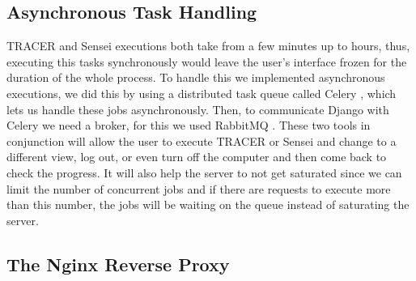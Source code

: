 \subsection{Asynchronous Task Handling}

\ac{TRACER} and Sensei executions both take from a few minutes up to hours,
thus, executing this tasks synchronously would leave the user's interface frozen
for the duration of the whole process.
To handle this we implemented asynchronous executions,
we did this by using a distributed task queue called Celery \autocite{Celery},
which lets us handle these jobs asynchronously.
Then, to communicate Django with Celery we need a broker,
for this we used RabbitMQ \autocite{RabbitMQ}.
These two tools in conjunction will allow the user to execute \ac{TRACER} or Sensei
and change to a different view, log out, or even turn off the computer
and then come back to check the progress.
It will also help the server to not get saturated
since we can limit the number of concurrent jobs
and if there are requests to execute more than this number,
the jobs will be waiting on the queue instead of saturating the server.


\subsection{The Nginx Reverse Proxy}

